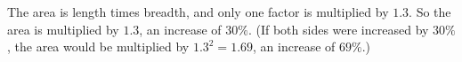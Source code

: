 The area is length times breadth, and only one factor is multiplied by $1.3$. So the area is multiplied by $1.3$, an increase of $\boxed{30\%}$. (If both sides were increased by $30\%$, the area would be multiplied by $1.3^2=1.69$, an increase of $69\%$.)
